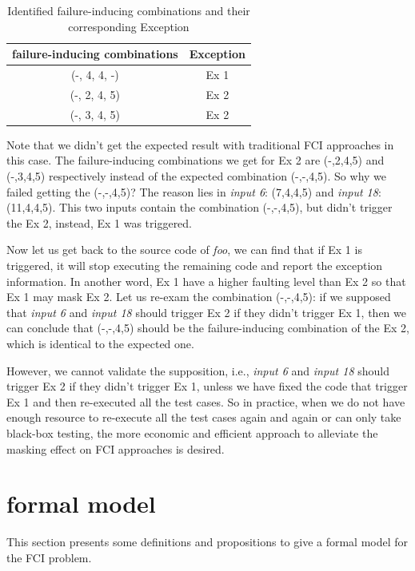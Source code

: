 \documentclass{sig-alternate}
\begin{document}
\begin{table}
\centering
\caption{Identified failure-inducing combinations and their corresponding Exception}
\label{identify-example}
\begin{tabular}{|c|c|} \hline
failure-inducing combinations & Exception\\ \hline
(-, 4, 4, -) &  Ex 1\\ \hline
(-, 2, 4, 5) &  Ex 2\\ \hline
(-, 3, 4, 5) &  Ex 2\\ \hline
\hline\end{tabular}
\end{table}

Note that we didn't get the expected result with traditional FCI approaches in this case. The failure-inducing combinations we get for Ex 2 are (-,2,4,5) and (-,3,4,5) respectively instead of the expected combination (-,-,4,5). So why we failed getting the (-,-,4,5)? The reason lies in \emph{input 6}: (7,4,4,5) and \emph{input 18}: (11,4,4,5). This two inputs contain the combination (-,-,4,5), but didn't trigger the Ex 2, instead,  Ex 1 was triggered.

Now let us get back to the source code of \emph{foo}, we can find that if Ex 1 is triggered, it will stop executing the remaining code and report the exception information. In another word, Ex 1 have a higher faulting level than Ex 2 so that Ex 1 may mask Ex 2. Let us re-exam the combination (-,-,4,5): if we supposed that \emph{input 6} and \emph{input 18} should trigger Ex 2 if they didn't trigger Ex 1, then we can conclude that (-,-,4,5) should be the failure-inducing combination of the Ex 2, which is identical to the expected one.

However, we cannot validate the supposition, i.e., \emph{input 6} and \emph{input 18} should trigger Ex 2 if they didn't trigger Ex 1, unless we have fixed the code that trigger Ex 1 and then re-executed all the test cases. So in practice, when we do not have enough resource to re-execute all the test cases again and again or can only take black-box testing, the more economic and efficient approach to alleviate the masking effect on FCI approaches is desired.

\section{formal model}
This section presents some definitions and propositions to give a formal model for the FCI problem.
\end{document}
